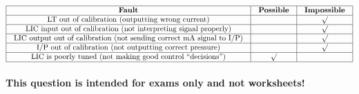 






$$\vbox{\offinterlineskip
\halign{\strut
\vrule \quad\hfil # \ \hfil & 
\vrule \quad\hfil # \ \hfil & 
\vrule \quad\hfil # \ \hfil \vrule \cr
\noalign{\hrule}
%
{\bf Fault} & {\bf Possible} & {\bf Impossible} \cr
%
\noalign{\hrule}
%
LT out of calibration (outputting wrong current) &  & $\surd$ \cr
%
\noalign{\hrule}
%
LIC input out of calibration (not interpreting signal properly) &  & $\surd$ \cr
%
\noalign{\hrule}
%
LIC output out of calibration (not sending correct mA signal to I/P) &  & $\surd$ \cr
%
\noalign{\hrule}
%
I/P out of calibration (not outputting correct pressure) &  & $\surd$ \cr
%
\noalign{\hrule}
%
LIC is poorly tuned (not making good control ``decisions'') & $\surd$ &  \cr
%
\noalign{\hrule}
} %
}$$ %







{\bf This question is intended for exams only and not worksheets!}



